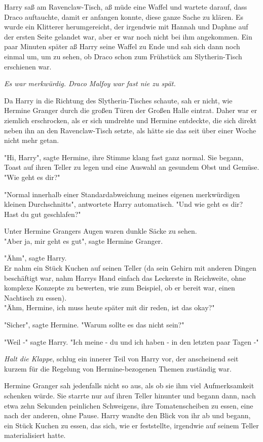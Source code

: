{Harry saß am Ravenclaw-Tisch, aß müde eine Waffel und wartete darauf, dass Draco auftauchte, damit er anfangen konnte, diese ganze Sache zu klären. Es wurde ein Klitterer herumgereicht, der irgendwie mit Hannah und Daphne auf der ersten Seite gelandet war, aber er war noch nicht bei ihm angekommen. Ein paar Minuten später aß Harry seine Waffel zu Ende und sah sich dann noch einmal um, um zu sehen, ob Draco schon zum Frühstück am Slytherin-Tisch erschienen war.

\emph{Es war merkwürdig. Draco Malfoy war fast nie zu spät.}

Da Harry in die Richtung des Slytherin-Tisches schaute, sah er nicht, wie Hermine Granger durch die großen Türen der Großen Halle eintrat. Daher war er ziemlich erschrocken, als er sich umdrehte und Hermine entdeckte, die sich direkt neben ihn an den Ravenclaw-Tisch setzte, als hätte sie das seit über einer Woche nicht mehr getan.

"Hi, Harry", sagte Hermine, ihre Stimme klang fast ganz normal. Sie begann, Toast auf ihren Teller zu legen und eine Auswahl an gesundem Obst und Gemüse.\\ "Wie geht es dir?"

"Normal innerhalb einer Standardabweichung meines eigenen merkwürdigen kleinen Durchschnitts", antwortete Harry automatisch. "Und wie geht es dir? Hast du gut geschlafen?"

Unter Hermine Grangers Augen waren dunkle Säcke zu sehen.\\ "Aber ja, mir geht es gut", sagte Hermine Granger.

"Ähm", sagte Harry.\\ Er nahm ein Stück Kuchen auf seinen Teller (da sein Gehirn mit anderen Dingen beschäftigt war, nahm Harrys Hand einfach das Leckerste in Reichweite, ohne komplexe Konzepte zu bewerten, wie zum Beispiel, ob er bereit war, einen Nachtisch zu essen).\\ "Ähm, Hermine, ich muss heute später mit dir reden, ist das okay?"

"Sicher", sagte Hermine. "Warum sollte es das nicht sein?"

"Weil -" sagte Harry. "Ich meine - du und ich haben - in den letzten paar Tagen -"

\emph{Halt die Klappe}, schlug ein innerer Teil von Harry vor, der anscheinend seit kurzem für die Regelung von Hermine-bezogenen Themen zuständig war.

Hermine Granger sah jedenfalls nicht so aus, als ob sie ihm viel Aufmerksamkeit schenken würde. Sie starrte nur auf ihren Teller hinunter und begann dann, nach etwa zehn Sekunden peinlichen Schweigens, ihre Tomatenscheiben zu essen, eine nach der anderen, ohne Pause. Harry wandte den Blick von ihr ab und begann, ein Stück Kuchen zu essen, das sich, wie er feststellte, irgendwie auf seinem Teller materialisiert hatte.

}
